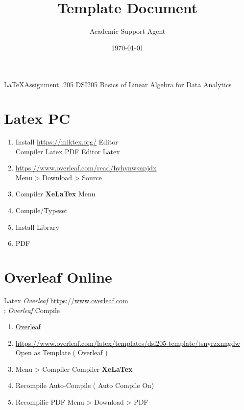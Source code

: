 \documentclass{article}
\title{Template Document}
\author{Academic Support Agent}
\date{\today}
\begin{document}
\maketitle

\maketitle

%  
  \LaTeX   Assignment    .205	 		
DSI205	Basics of Linear Algebra for Data Analytics

\section{  Latex   PC}
\begin{enumerate}
\item     Install    \url{https://miktex.org/}      Editor \\
   Compiler   Latex   PDF      Editor   Latex  
\item   \url{https://www.overleaf.com/read/hyhynwsnpjdx}  \\
  Menu > Download > Source
\item   {}      Compiler   \textbf{XeLaTex}   Menu
\item     Compile/Typeset
\item   Install   Library
\item   PDF  
\end{enumerate}


\section{  Overleaf   Online}
  Latex     \emph{Overleaf} \url{https://www.overleaf.com} \\
 :   \emph{Overleaf}   Compile  
\begin{enumerate}
\item   \href{https://www.overleaf.com}{Overleaf}
\item   \url{https://www.overleaf.com/latex/templates/dsi205-template/tsnyrzxnngdw}   Open as Template (  Overleaf  )
\item   Menu > Compiler   Compiler   \textbf{XeLaTex}
\item   Recompile   Auto-Compile (      Auto Compile   On)
\item     Recompilie   PDF   Menu > Download > PDF
\end{enumerate}
\end{document}
